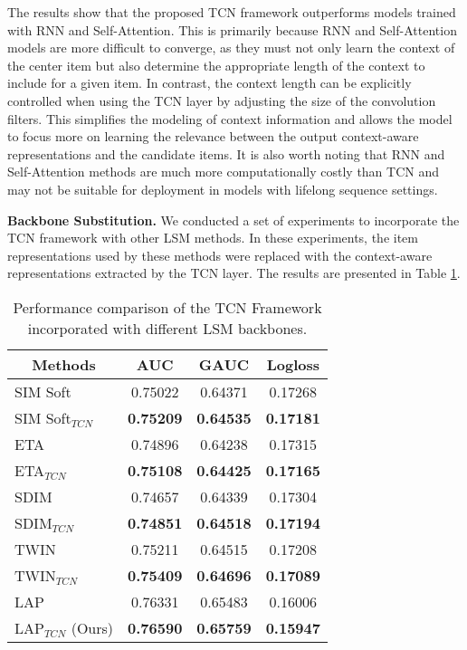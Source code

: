 The results show that the proposed TCN framework outperforms models trained with RNN and Self-Attention. This is primarily because RNN and Self-Attention models are more difficult to converge, as they must not only learn the context of the center item but also determine the appropriate length of the context to include for a given item. In contrast, the context length can be explicitly controlled when using the TCN layer by adjusting the size of the convolution filters. This simplifies the modeling of context information and allows the model to focus more on learning the relevance between the output context-aware representations and the candidate items. It is also worth noting that RNN and Self-Attention methods are much more computationally costly than TCN and may not be suitable for deployment in models with lifelong sequence settings. 

\textbf{Backbone Substitution.} We conducted a set of experiments to incorporate the TCN framework with other LSM methods. In these experiments, the item representations used by these methods were replaced with the context-aware representations extracted by the TCN layer. The results are presented in Table \ref{tab:tcnLSMs}. 

\begin{table}[t]
    \centering
    \caption{Performance comparison of the TCN Framework incorporated with different LSM backbones.}
    \begin{tabular}{cccc}
    \toprule
     Methods & AUC & GAUC & Logloss \\
    \midrule
    \multicolumn{1}{l|}{SIM Soft} & 0.75022 & 0.64371 & 0.17268 \\
    \multicolumn{1}{l|}{SIM Soft$_{TCN}$} & \textbf{0.75209} & \textbf{0.64535} & \textbf{0.17181} \\
    \midrule
    \multicolumn{1}{l|}{ETA} & 0.74896 & 0.64238 & 0.17315 \\
    \multicolumn{1}{l|}{ETA$_{TCN}$} & \textbf{0.75108} & \textbf{0.64425} & \textbf{0.17165} \\
    \midrule
    \multicolumn{1}{l|}{SDIM} & 0.74657 & 0.64339 & 0.17304 \\
    \multicolumn{1}{l|}{SDIM$_{TCN}$} & \textbf{0.74851} & \textbf{0.64518} & \textbf{0.17194} \\
    \midrule
    \multicolumn{1}{l|}{TWIN} & 0.75211 & 0.64515 & 0.17208 \\
    \multicolumn{1}{l|}{TWIN$_{TCN}$} & \textbf{0.75409} & \textbf{0.64696} & \textbf{0.17089} \\
    \midrule
    \multicolumn{1}{l|}{LAP} & 0.76331 & 0.65483 & 0.16006 \\
    \multicolumn{1}{l|}{LAP$_{TCN}$ (Ours)} & \textbf{0.76590} & \textbf{0.65759} & \textbf{0.15947} \\
    \bottomrule
    \end{tabular}
    \label{tab:tcnLSMs}
    \vspace{-0.3cm}
\end{table}	

